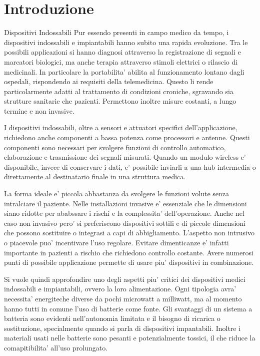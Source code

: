 \chapter{Introduzione}

\begin{section}{Dispositivi Indossabili}
    Pur essendo presenti in campo medico da tempo, i dispositivi indossabili e impiantabili hanno subito una rapida evoluzione. Tra le possibili applicazioni si hanno diagnosi attraverso la registrazione di segnali e marcatori biologici, ma anche terapia attraverso stimoli elettrici o rilascio di medicinali. In particolare la portabilita' abilita al funzionamento lontano dagli ospedali, rispondendo ai requisiti della telemedicina. Questo li rende particolarmente adatti al trattamento di condizioni croniche, sgravando sia strutture sanitarie che pazienti. Permettono inoltre misure costanti, a lungo termine e non invasive. 

    I dispositivi indossabili, oltre a sensori e attuatori specifici dell'applicazione, richiedono anche componenti a bassa potenza come processori e antenne. Questi componenti sono necessari per svolgere funzioni di controllo automatico, elaborazione e trasmissione dei segnali misurati. Quando un modulo wireless e' disponibile, invece di conservare i dati, e' possibile inviarli a una hub intermedia o direttamente al destinatario finale in una struttura medica.

    La forma ideale e' piccola abbastanza da svolgere le funzioni volute senza intralciare il paziente. Nelle installazioni invasive e' essenziale che le dimensioni siano ridotte per ababssare i rischi e la complessita' dell'operazione. Anche nel caso non invasivo pero' si preferiscono dispositivi sottili e di piccole dimensioni che possono sostituire o integrasi a capi di abbigliamento. L'aspetto non intrusivo o piacevole puo' incentivare l'uso regolare. Evitare dimenticanze e' infatti importante in pazienti a rischio che richiedono controllo costante. Avere numerosi punti di possibile applicazione permette di usare piu' dispositivi in combinazione.
    
    Si vuole quindi approfondire uno degli aspetti piu' critici dei dispositivi medici indossabili e impiantabili, ovvero la loro alimentazione. Ogni tipologia avra' necessita' energiteche diverse da pochi microwatt a milliwatt, ma al momento hanno tutti in comune l'uso di batterie come fonte. Gli svantaggi di un sistema a batteria sono evidenti nell'autonomia limitata e il bisogno di ricarica o sostituzione, specialmente quando si parla di dispositivi impantabili. Inoltre i materiali usati nelle batterie sono pesanti e potenzialmente tossici, il che riduce la comapitibilita' all'uso prolungato.
\end{section}

